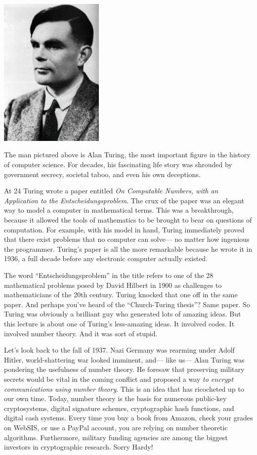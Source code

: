 \centerline{\includegraphics[width=2in]{figures/turing.pdf}}

The man pictured above is Alan Turing, the most important figure in
the history of computer science.  For decades, his fascinating life
story was shrouded by government secrecy, societal taboo, and even his
own deceptions.

At 24 Turing wrote a paper entitled \emph{On Computable Numbers, with an
Application to the Entscheidungsproblem}.  The crux of the paper was an
elegant way to model a computer in mathematical terms.  This was a
breakthrough, because it allowed the tools of mathematics to be brought to
bear on questions of computation.  For example, with his model in hand,
Turing immediately proved that there exist problems that no computer can
solve--- no matter how ingenious the programmer.  Turing's paper is all the
more remarkable because he wrote it in 1936, a full decade before any
electronic computer actually existed.

The word ``Entscheidungsproblem'' in the title refers to one of the 28
mathematical problems posed by David Hilbert in 1900 as challenges to
mathematicians of the 20th century.  Turing knocked that one off in
the same paper.  And perhaps you've heard of the ``Church-Turing
thesis''?  Same paper.  So Turing was obviously a brilliant guy who
generated lots of amazing ideas.  But this lecture is about one of
Turing's less-amazing ideas.  It involved codes.  It involved number
theory.  And it was sort of stupid.


Let's look back to the fall of 1937.  Nazi Germany was rearming under
Adolf Hitler, world-shattering war looked imminent, and--- like us--- Alan
Turing was pondering the usefulness of number theory.  He foresaw that
preserving military secrets would be vital in the coming conflict and
proposed a way \emph{to encrypt communications using number theory}.
This is an idea that has ricocheted up to our own time.  Today, number
theory is the basis for numerous public-key cryptosystems, digital
signature schemes, cryptographic hash functions, and digital cash systems.
Every time you buy a book from Amazon, check your grades on WebSIS, or use
a PayPal account, you are relying on number theoretic algorithms.
Furthermore, military funding agencies are among the biggest investors in
cryptographic research.  Sorry Hardy!


